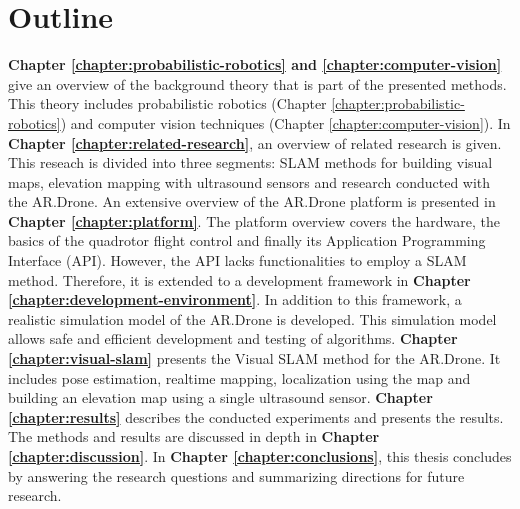 	\section{Outline}
\textbf{Chapter \ref{chapter:probabilistic-robotics} and \ref{chapter:computer-vision}} give an overview of the background theory that is part of the presented methods.
This theory includes probabilistic robotics (Chapter \ref{chapter:probabilistic-robotics}) and computer vision techniques (Chapter \ref{chapter:computer-vision}).
In \textbf{Chapter \ref{chapter:related-research}}, an overview of related research is given.
This reseach is divided into three segments: SLAM methods for building visual maps, elevation mapping with ultrasound sensors and research conducted with the AR.Drone.
An extensive overview of the AR.Drone platform is presented in \textbf{Chapter \ref{chapter:platform}}.
The platform overview covers the hardware, the basics of the quadrotor flight control and finally its Application Programming Interface (API).
However, the API lacks functionalities to employ a SLAM method.
Therefore, it is extended to a development framework in \textbf{Chapter \ref{chapter:development-environment}}.
In addition to this framework, a realistic simulation model of the AR.Drone is developed.
This simulation model allows safe and efficient development and testing of algorithms.
\textbf{Chapter \ref{chapter:visual-slam}} presents the Visual SLAM method for the AR.Drone.
It includes pose estimation, realtime  mapping, localization using the map and building an elevation map using a single ultrasound sensor.
\textbf{Chapter \ref{chapter:results}} describes the conducted experiments and presents the results.
The methods and results are discussed in depth in \textbf{Chapter \ref{chapter:discussion}}.
In \textbf{Chapter \ref{chapter:conclusions}}, this thesis concludes by answering the research questions and summarizing directions for future research.